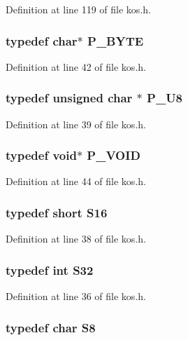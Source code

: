 Definition at line 119 of file kos.h.
\subsubsection{\setlength{\rightskip}{0pt plus 5cm}typedef char$\ast$ P\_\-BYTE}\label{kos_8h_a50}




Definition at line 42 of file kos.h.
\subsubsection{\setlength{\rightskip}{0pt plus 5cm}typedef unsigned char $\ast$ P\_\-U8}\label{kos_8h_a47}




Definition at line 39 of file kos.h.
\subsubsection{\setlength{\rightskip}{0pt plus 5cm}typedef void$\ast$ P\_\-VOID}\label{kos_8h_a52}




Definition at line 44 of file kos.h.
\subsubsection{\setlength{\rightskip}{0pt plus 5cm}typedef short S16}\label{kos_8h_a45}




Definition at line 38 of file kos.h.
\subsubsection{\setlength{\rightskip}{0pt plus 5cm}typedef int S32}\label{kos_8h_a43}




Definition at line 36 of file kos.h.
\subsubsection{\setlength{\rightskip}{0pt plus 5cm}typedef char S8}\label{kos_8h_a48}




